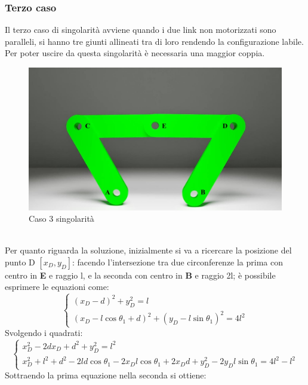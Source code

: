 \subsubsection*{Terzo caso}
Il terzo caso di singolarità avviene quando i due link non motorizzati sono paralleli, si hanno tre giunti allineati tra di loro rendendo la configurazione labile. Per poter uscire da questa singolarità è necessaria una maggior coppia.
\begin{figure}[ht]
	\begin{center}
		\includegraphics[scale=0.3]{Immagini/Singolarity/5}
		\caption{Caso 3 singolarità}
	\end{center}
\end{figure}
\\Per quanto riguarda la soluzione, inizialmente si va a ricercare la posizione del punto D $[x_D,y_D]$: facendo l'intersezione tra due circonferenze la prima con centro in \textbf{E} e raggio l, e la seconda con centro in \textbf{B} e raggio 2l; è possibile esprimere le equazioni come:
\begin{equation}
	\begin{cases}
		(x_D-d)^2 +y_D^2= l \\
		(x_D-l\cos\theta_1+d)^2 + (y_D-l\sin\theta_1)^2 = 4l^2
	\end{cases}
\end{equation}
Svolgendo i quadrati:
\begin{equation*}
	\begin{cases}
	 x_D^2-2dx_D+d^2+y_D^2 = l^2 \\
	 x_D^2+ l^2 + d^2-2ld\cos\theta_1 -2x_Dl\cos\theta_1+2x_Dd + y_D^2-2y_Dl\sin\theta_1 = 4l^2-l^2
	\end{cases}
\end{equation*}
Sottraendo la prima equazione nella seconda si ottiene: 
